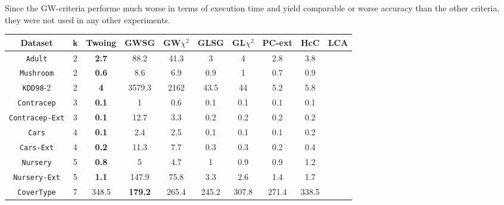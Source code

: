 Since the GW-criteria performe much worse in terms of execution time and yield comparable or worse accuracy than the other criteria, they were not used in any other experiments.

\begin{table}[]
\scriptsize
\centering
\begin{tabular}{c|c|c|c|c|c|c|c|c|c}
Dataset             & k  & Twoing     & GWSG       & GW$\chi^2$  & GLSG      & GL$\chi^2$ & PC-ext     & HcC        & LCA        \\
\hline
{\tt Adult}         & 2  & {\bf 2.7}  & 88.2       & 41.3        & 3         & 4          & 2.8        & 3.8        &            \\
{\tt Mushroom}      & 2  & {\bf 0.6}  & 8.6        & 6.9         & 0.9       & 1          & 0.7        & 0.9        &            \\
{\tt KDD98}-2       & 2  & {\bf 4}    & 3579.3     & 2162        & 43.5      & 44         & 5.2        & 5.8        &            \\
{\tt Contracep}     & 3  & {\bf 0.1}  & 1          & 0.6         & 0.1       & 0.1        & 0.1        & 0.1        &            \\
{\tt Contracep-Ext} & 3  & {\bf 0.1}  & 12.7       & 3.3         & 0.2       & 0.2        & 0.2        & 0.2        &            \\
{\tt Cars}          & 4  & {\bf 0.1}  & 2.4        & 2.5         & 0.1       & 0.1        & 0.1        & 0.2        &            \\
{\tt Cars-Ext}      & 4  & {\bf 0.2}  & 11.3       & 7.7         & 0.3       & 0.3        & 0.2        & 0.4        &            \\
{\tt Nursery}       & 5  & {\bf 0.8}  & 5          & 4.7         & 1         & 0.9        & 0.9        & 1.2        &            \\
{\tt Nursery-Ext}   & 5  & {\bf 1.1}  & 147.9      & 75.8        & 3.3       & 2.6        & 1.4        & 1.7        &            \\
{\tt CoverType}     & 7  & 348.5      & {\bf 179.2}&  265.4      & 245.2     & 307.8      & 271.4      & 338.5      &            \\

\end{tabular}
\end{table}
